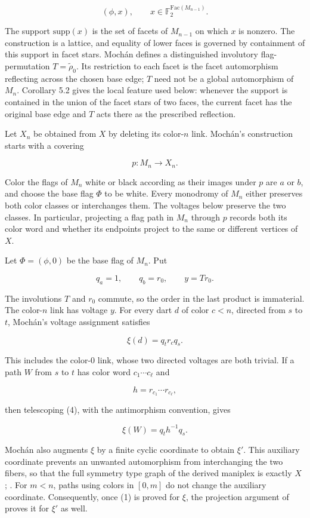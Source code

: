 \documentclass[11pt]{article}
\begin{document}
\[
(\phi,x),\qquad
x\in\mathbb F_2^{\mathrm{Fac}(M_{n-1})}.
\]

The support $\mathrm{supp}(x)$ is the set of facets of $M_{n-1}$ on which $x$ is nonzero. The
construction is a lattice, and equality of lower faces is governed by containment of this support
in facet stars. Mochán defines a distinguished involutory flag-permutation
$T=\widetilde\rho_0$. Its restriction to each facet is the facet automorphism reflecting across the
chosen base edge; $T$ need not be a global automorphism of $M_n$. Corollary 5.2 gives the local
feature used below: whenever the support is contained in the union of the facet stars of two faces,
the current facet has the original base edge and $T$ acts there as the prescribed reflection.

Let $X_n$ be obtained from $X$ by deleting its color-$n$ link. Mochán's construction starts with a
covering

\[
p:M_n\longrightarrow X_n.
\]

Color the flags of $M_n$ white or black according as their images under $p$ are $a$ or $b$, and
choose the base flag $\Phi$ to be white. Every monodromy of $M_n$ either preserves both color
classes or interchanges them. The voltages below preserve the two classes. In particular, projecting
a flag path in $M_n$ through $p$ records both its color word and whether its endpoints project to
the same or different vertices of $X$.

Let $\Phi=(\phi,0)$ be the base flag of $M_n$. Put

\[
q_a=1,\qquad q_b=r_0,\qquad y=Tr_0.
\tag{3}
\]

The involutions $T$ and $r_0$ commute, so the order in the last product is immaterial. The color-$n$
link has voltage $y$. For every dart $d$ of color $c<n$, directed from $s$ to $t$, Mochán's voltage
assignment satisfies

\[
\xi(d)=q_t r_c q_s.
\tag{4}
\]

This includes the color-$0$ link, whose two directed voltages are both trivial. If a path $W$ from
$s$ to $t$ has color word $c_1\cdots c_\ell$ and

\[
h=r_{c_1}\cdots r_{c_\ell},
\]

then telescoping (4), with the antimorphism convention, gives

\[
\xi(W)=q_t h^{-1}q_s.
\tag{5}
\]

Mochán also augments $\xi$ by a finite cyclic coordinate to obtain $\xi'$. This auxiliary coordinate
prevents an unwanted automorphism from interchanging the two fibers, so that the full symmetry type
graph of the derived maniplex is exactly $X$
\cite[equation (3) and Corollary 6.5]{mochan2024};
\cite[Propositions 19 and 20 and Theorems 29 and 31]{ppt2019}.
For $m<n$, paths using colors in $[0,m]$ do not change the auxiliary coordinate. Consequently, once
(1) is proved for $\xi$, the projection argument of \cite[Corollary 6.5]{mochan2024} proves it for $\xi'$ as well.
\end{document}
